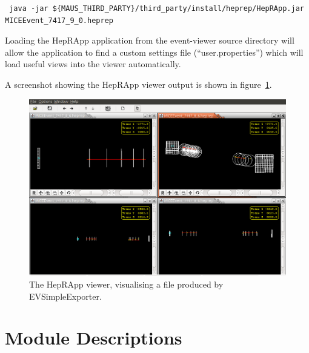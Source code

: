\documentclass[a4paper,10pt]{article}
\begin{document}
\begin{lstlisting}
 java -jar ${MAUS_THIRD_PARTY}/third_party/install/heprep/HepRApp.jar MICEEvent_7417_9_0.heprep
\end{lstlisting}

Loading the HepRApp application from the event-viewer source directory will allow the application to find a custom settings file (``user.properties'') which will load useful views into the viewer automatically.

A screenshot showing the HepRApp viewer output is shown in figure~\ref{fig:HepRApp}.

\begin{figure}[hbt]
  \begin{center}
    \includegraphics[width=1.0\linewidth]{./graphics/HepRApp.png}
    \caption{The HepRApp viewer, visualising a file produced by EVSimpleExporter.}
    \label{fig:HepRApp}
  \end{center}
\end{figure}




\appendix

\section{Module Descriptions}
\label{ModuleDescriptions}
\end{document}
